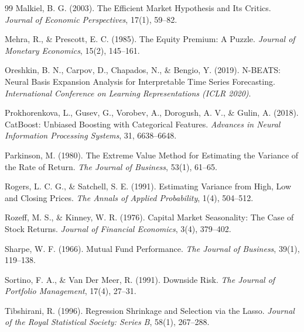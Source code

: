 \documentclass[11pt,a4paper]{article}
\begin{document}
\begin{thebibliography}{99}
Malkiel, B. G. (2003).
\newblock The Efficient Market Hypothesis and Its Critics.
\newblock \textit{Journal of Economic Perspectives}, 17(1), 59--82.

Mehra, R., \& Prescott, E. C. (1985).
\newblock The Equity Premium: A Puzzle.
\newblock \textit{Journal of Monetary Economics}, 15(2), 145--161.

Oreshkin, B. N., Carpov, D., Chapados, N., \& Bengio, Y. (2019).
\newblock N-BEATS: Neural Basis Expansion Analysis for Interpretable Time Series Forecasting.
\newblock \textit{International Conference on Learning Representations (ICLR 2020)}.

Prokhorenkova, L., Gusev, G., Vorobev, A., Dorogush, A. V., \& Gulin, A. (2018).
\newblock CatBoost: Unbiased Boosting with Categorical Features.
\newblock \textit{Advances in Neural Information Processing Systems}, 31, 6638--6648.

Parkinson, M. (1980).
\newblock The Extreme Value Method for Estimating the Variance of the Rate of Return.
\newblock \textit{The Journal of Business}, 53(1), 61--65.

Rogers, L. C. G., \& Satchell, S. E. (1991).
\newblock Estimating Variance from High, Low and Closing Prices.
\newblock \textit{The Annals of Applied Probability}, 1(4), 504--512.

Rozeff, M. S., \& Kinney, W. R. (1976).
\newblock Capital Market Seasonality: The Case of Stock Returns.
\newblock \textit{Journal of Financial Economics}, 3(4), 379--402.

Sharpe, W. F. (1966).
\newblock Mutual Fund Performance.
\newblock \textit{The Journal of Business}, 39(1), 119--138.

Sortino, F. A., \& Van Der Meer, R. (1991).
\newblock Downside Risk.
\newblock \textit{The Journal of Portfolio Management}, 17(4), 27--31.

Tibshirani, R. (1996).
\newblock Regression Shrinkage and Selection via the Lasso.
\newblock \textit{Journal of the Royal Statistical Society: Series B}, 58(1), 267--288.


\end{thebibliography}
\end{document}
